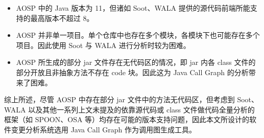 \begin{itemize}
    \item AOSP 中的 Java 版本为 11，但诸如 Soot、WALA 提供的源代码前端所能支持的最高版本不超过 8。
    \item AOSP 并非单一项目。单个仓库中也存在多个模块，各模块下也可能存在多个项目。因此使用 Soot 与 WALA 进行分析时较为困难。
    \item AOSP 所生成的部分 jar 文件存在无代码区的情况，即 jar 内各 class 文件的部分开放且非抽象方法不存在 code 块。因此这为 Java Call Graph 的分析带来了困难。
\end{itemize}

综上所述，尽管 AOSP 中存在部分 jar 文件中的方法无代码区，但考虑到 Soot、WALA 以及其他一系列上文未提及的依靠源代码或 class 文件做代码全量分析的框架（如 SPOON、OSA 等）均存在可能的版本支持问题，因此本文所设计的软件变更分析系统选用 Java Call Graph 作为调用图生成工具。

